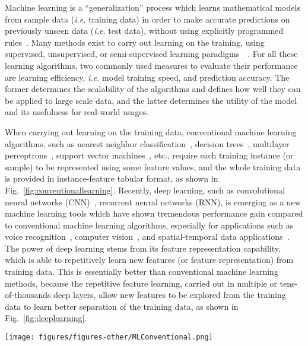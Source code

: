 \documentclass[../dropout-vs-batch-normalization.tex]{subfiles}
\begin{document}
Machine learning is a ``generalization'' process which learns mathematical models from sample data (\textit{i.e.} training data) in order to make accurate predictions on previously unseen data (\textit{i.e.} test data), without using explicitly programmed rules~\cite{Goodfellow2016}. Many methods exist to carry out learning on the training, using supervised, unsupervised, or semi-supervised learning paradigms~\cite{Goodfellow2016}~\cite{zhu05survey}. For all these learning algorithms, two commonly used  measures to evaluate their performance are learning efficiency, \textit{i.e.} model training speed, and prediction accuracy. The former determines the scalability of the algorithms and defines how well they can be applied to large scale data, and the latter determines the utility of the model and its usefulness for real-world usages. 


When carrying out learning on the training data, conventional machine learning algorithms, such as nearest neighbor classification~\cite{StanfordCS231n-NN}, decision trees~\cite{}, multilayer perceptrons~\cite{}, support vector machines~\cite{}, etc., require each training instance (or sample) to be represented using some feature values, and the whole training data is provided in instance-feature tabular format, as shown in Fig.~\ref{fig:conventionallearning}. Recently, deep learning, such as convolutional neural networks (CNN)~\cite{LeCun2015a}, recurrent neural networks (RNN), is emerging as a new machine learning tools which have shown tremendous performance gain compared to conventional machine learning algorithms, especially for applications such as voice recognition~\cite{}, computer vision~\cite{}, and spatial-temporal data applications~\cite{}. The power of deep learning stems from its feature representation capability, which is able to repetitively learn new features (or feature representation) from training data. This is essentially better than conventional machine learning methods, because the repetitive feature learning, carried out in multiple or tens-of-thousands deep layers, allow new features to be explored from the training data to learn better separation of the training data, as shown in Fig.~\ref{fig:deeplearning}. 

\begin{figure*}[!htbp]
\centerline{\texttt{[image: figures/figures-other/MLConventional.png]}}
\caption{A conventional machine learning process, where training data, represented in instance-feature tabular format are provided to learn generalization models, which are further applied to make predictions on the previously unseen test data.}
\label{fig:conventionallearning}
\end{figure*}
\end{document}
